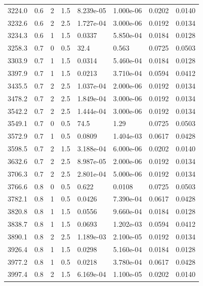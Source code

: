 \documentclass[preview]{standalone}
\begin{document}
{{{\begin{tabular}{L{1.2cm}C{1.2cm} C{0.3cm}C{0.5cm} C{1.4cm}C{1.4cm} C{1.4cm}C{1.4cm}}
  3224.0  &   0.6  & 2     & 1.5 &  8.239e-05  & 1.000e-06  & 0.0202 &  0.0140   \\ 
  3232.6  &   0.6  & 2     & 2.5 &  1.727e-04  & 3.000e-06  & 0.0192 &  0.0134   \\ 
  3234.3  &   0.6  & 1     & 1.5 &  0.0337  & 5.850e-04  & 0.0184 &  0.0128   \\ 
  3258.3  &   0.7  & 0     & 0.5 &  32.4  & 0.563  & 0.0725 &  0.0503   \\ 
  3303.9  &   0.7  & 1     & 1.5 &  0.0314  & 5.460e-04  & 0.0184 &  0.0128   \\ 
  3397.9  &   0.7  & 1     & 1.5 &  0.0213  & 3.710e-04  & 0.0594 &  0.0412   \\ 
  3435.5  &   0.7  & 2     & 2.5 &  1.037e-04  & 2.000e-06  & 0.0192 &  0.0134   \\ 
  3478.2  &   0.7  & 2     & 2.5 &  1.849e-04  & 3.000e-06  & 0.0192 &  0.0134   \\ 
  3542.2  &   0.7  & 2     & 2.5 &  1.444e-04  & 3.000e-06  & 0.0192 &  0.0134   \\ 
  3549.1  &   0.7  & 0     & 0.5 &  74.5  & 1.29  & 0.0725 &  0.0503   \\ 
  3572.9  &   0.7  & 1     & 0.5 &  0.0809  & 1.404e-03  & 0.0617 &  0.0428   \\ 
  3598.5  &   0.7  & 2     & 1.5 &  3.188e-04  & 6.000e-06  & 0.0202 &  0.0140   \\ 
  3632.6  &   0.7  & 2     & 2.5 &  8.987e-05  & 2.000e-06  & 0.0192 &  0.0134   \\ 
  3706.3  &   0.7  & 2     & 2.5 &  2.801e-04  & 5.000e-06  & 0.0192 &  0.0134   \\ 
  3766.6  &   0.8  & 0     & 0.5 &  0.622  & 0.0108  & 0.0725 &  0.0503   \\ 
  3782.1  &   0.8  & 1     & 0.5 &  0.0426  & 7.390e-04  & 0.0617 &  0.0428   \\ 
  3820.8  &   0.8  & 1     & 1.5 &  0.0556  & 9.660e-04  & 0.0184 &  0.0128   \\ 
  3838.7  &   0.8  & 1     & 1.5 &  0.0693  & 1.202e-03  & 0.0594 &  0.0412   \\ 
  3890.1  &   0.8  & 2     & 2.5 &  1.189e-03  & 2.100e-05  & 0.0192 &  0.0134   \\ 
  3926.4  &   0.8  & 1     & 1.5 &  0.0298  & 5.160e-04  & 0.0184 &  0.0128   \\ 
  3977.2  &   0.8  & 1     & 0.5 &  0.0218  & 3.780e-04  & 0.0617 &  0.0428   \\ 
  3997.4  &   0.8  & 2     & 1.5 &  6.169e-04  & 1.100e-05  & 0.0202 &  0.0140   \\ 

\end{tabular}}}}
\end{document}
